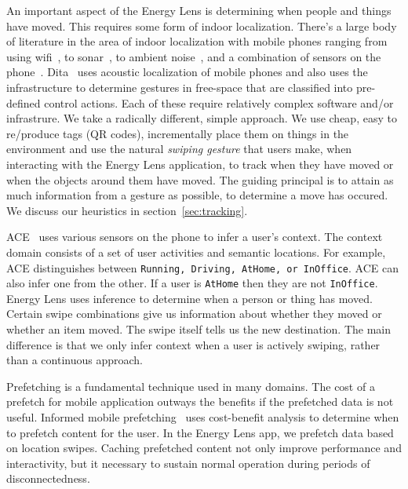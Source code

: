 An important aspect of the Energy Lens is determining when people and things have moved.  This requires some form 
of indoor localization.  There's a large body of literature in the area of indoor localization with mobile phones ranging from 
using wifi~\cite{radar}, to sonar~\cite{cricket}, to ambient noise~\cite{abs}, and a combination of sensors on the 
phone~\cite{surroundsense, darwinphone}.  Dita~\cite{dita} uses acoustic localization of mobile phones and also uses the infrastructure 
to determine gestures in free-space that are classified into pre-defined control actions.  Each of these require relatively complex 
software and/or infrastrure.  
We take a radically different, simple approach.  We use cheap, easy to re/produce tags (QR codes), incrementally place them on things in the 
environment and use the natural \emph{swiping gesture} that users make, when interacting with the Energy Lens 
application, to track when they have moved or when the objects around them have moved.  The guiding principal is to attain as much 
information from a gesture as possible, to determine a move has occured.  We discuss our heuristics in section~\ref{sec:tracking}.

ACE~\cite{ACE} uses various sensors on the phone to infer a user's context.  The context domain consists of a set of user activities
and semantic locations.  For example, ACE distinguishes between {\tt Running, Driving, AtHome, or InOffice}.  ACE can also infer 
one from the other.  If a user is {\tt AtHome} then they are not {\tt InOffice}.  Energy Lens uses inference to determine
when a person or thing has moved.  Certain swipe combinations give us information about whether they moved or
whether an item moved.  The swipe itself tells us the new destination.  The main difference is that we only infer context 
when a user is actively swiping, rather
than a continuous approach.  

Prefetching is a fundamental technique used in many domains.  The cost of a prefetch for mobile
application outways the benefits if the prefetched data is not useful.  Informed mobile prefetching~\cite{imp_mobisys2012} uses cost-benefit analysis 
to determine when to prefetch content for the user.  In the Energy Lens app, we prefetch data based on location swipes.
Caching prefetched content not only improve performance and interactivity, but it necessary to sustain normal
operation during periods of disconnectedness.

